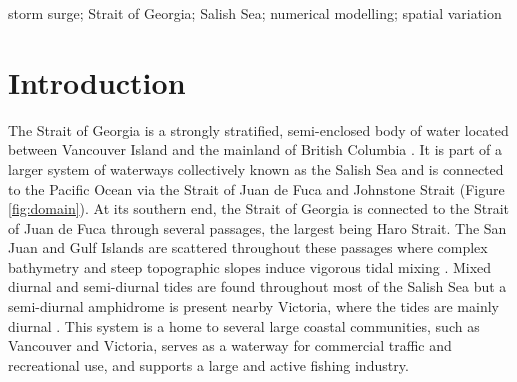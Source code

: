 \documentclass[letterpaper]{tATO2e}
\begin{document}
\begin{keywords}storm surge; Strait of Georgia; Salish Sea; numerical modelling; spatial variation
\end{keywords}

\section{Introduction}\label{sec:intro}

The Strait of Georgia is a strongly stratified, semi-enclosed body of water located between Vancouver Island and the mainland of British Columbia {\color{red}\citep{thomson1981oceanography}}. It is part of a larger system of waterways collectively known as the Salish Sea and is connected to the Pacific Ocean via the Strait of Juan de Fuca and Johnstone Strait (Figure \ref{fig:domain}). At its southern end, the Strait of Georgia is connected to the Strait of Juan de Fuca through several passages, the largest being Haro Strait. The San Juan and Gulf Islands are scattered throughout these passages where complex bathymetry and steep topographic slopes induce vigorous tidal mixing {\color{red}\citep{thomson1981oceanography}}.  Mixed diurnal and semi-diurnal tides are found throughout most of the Salish Sea but a semi-diurnal amphidrome is present nearby Victoria, where the tides are mainly diurnal \citep{thomson1981oceanography}. This system is {\color{red} a} home to several large coastal communities, such as Vancouver and Victoria, serves as a waterway for commercial traffic and recreational use, and supports a large and active fishing industry.   

\end{document}

